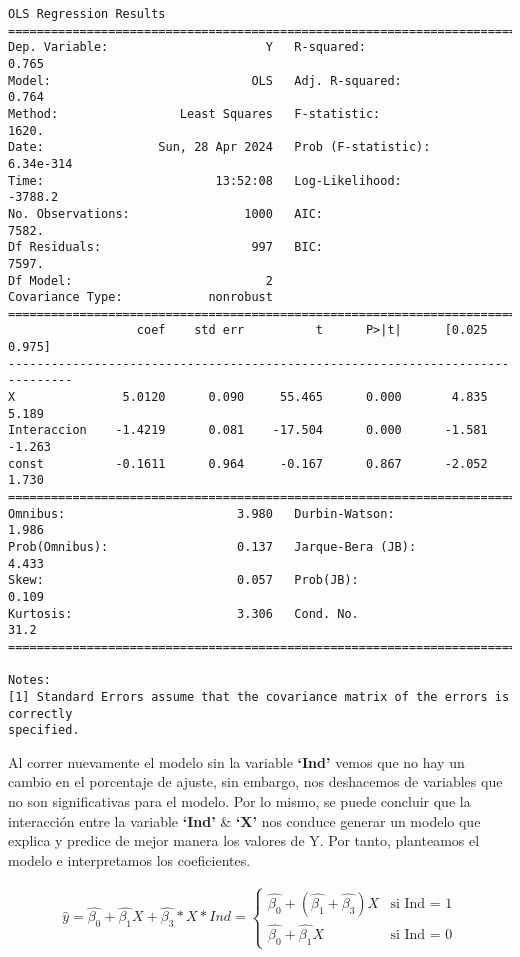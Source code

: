 \documentclass[11pt]{article}
\begin{document}
    \begin{Verbatim}[commandchars=\\\{\}]
                            OLS Regression Results
==============================================================================
Dep. Variable:                      Y   R-squared:                       0.765
Model:                            OLS   Adj. R-squared:                  0.764
Method:                 Least Squares   F-statistic:                     1620.
Date:                Sun, 28 Apr 2024   Prob (F-statistic):          6.34e-314
Time:                        13:52:08   Log-Likelihood:                -3788.2
No. Observations:                1000   AIC:                             7582.
Df Residuals:                     997   BIC:                             7597.
Df Model:                           2
Covariance Type:            nonrobust
===============================================================================
                  coef    std err          t      P>|t|      [0.025      0.975]
-------------------------------------------------------------------------------
X               5.0120      0.090     55.465      0.000       4.835       5.189
Interaccion    -1.4219      0.081    -17.504      0.000      -1.581      -1.263
const          -0.1611      0.964     -0.167      0.867      -2.052       1.730
==============================================================================
Omnibus:                        3.980   Durbin-Watson:                   1.986
Prob(Omnibus):                  0.137   Jarque-Bera (JB):                4.433
Skew:                           0.057   Prob(JB):                        0.109
Kurtosis:                       3.306   Cond. No.                         31.2
==============================================================================

Notes:
[1] Standard Errors assume that the covariance matrix of the errors is correctly
specified.
    \end{Verbatim}

    Al correr nuevamente el modelo sin la variable \textbf{`Ind'} vemos que
no hay un cambio en el porcentaje de ajuste, sin embargo, nos deshacemos
de variables que no son significativas para el modelo. Por lo mismo, se
puede concluir que la interacción entre la variable \textbf{`Ind'} \&
\textbf{`X'} nos conduce generar un modelo que explica y predice de
mejor manera los valores de Y. Por tanto, planteamos el modelo e
interpretamos los coeficientes.

\[ \begin{align} 
\hat{y} = \hat{\beta_0} + \hat{\beta_1}X + \hat{\beta_3}*X*Ind = \left\{ 
    \begin{array}{ll} \hat{\beta_0}+ (\hat{\beta_1} + \hat{\beta_3})X & \text{si  Ind = 1} \\ 
    \hat{\beta_0} + \hat{\beta_1}X & \text {si  Ind = 0} \end{array} \right. \end{align} \]
\end{document}
